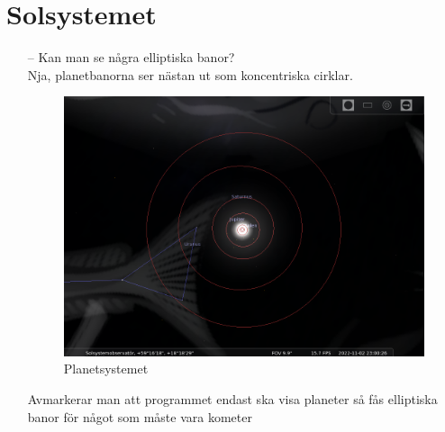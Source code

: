 \documentclass[./exercises.tex]{subfiles}
\begin{document}
\newpage
\section{Solsystemet}
\begin{itemize}
    \item[--] Kan man se några elliptiska banor?\\
Nja, planetbanorna ser nästan ut som koncentriska cirklar.

\begin{figure}[H]
\centering
  \includegraphics[scale=0.35]{stellarium-003.png}
  \caption{Planetsystemet}
  \label{fig4}
\end{figure}
Avmarkerar man att programmet endast ska visa planeter så fås elliptiska banor för något som
måste vara kometer


\end{itemize}
\end{document}
